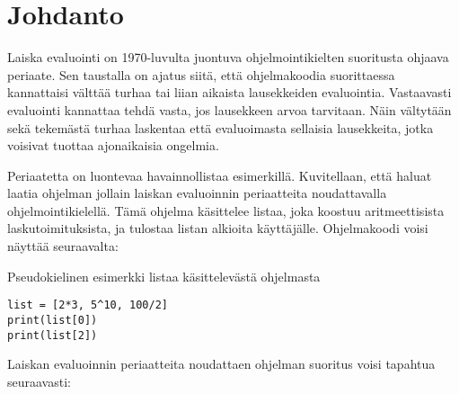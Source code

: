 
\section{Johdanto}

Laiska evaluointi on 1970-luvulta juontuva ohjelmointikielten suoritusta ohjaava periaate. Sen taustalla on ajatus siitä, että ohjelmakoodia suorittaessa kannattaisi välttää turhaa tai liian aikaista lausekkeiden evaluointia. Vastaavasti evaluointi kannattaa tehdä vasta, jos lausekkeen arvoa tarvitaan. Näin vältytään sekä tekemästä turhaa laskentaa että evaluoimasta sellaisia lausekkeita, jotka voisivat tuottaa ajonaikaisia ongelmia.

Periaatetta on luontevaa havainnollistaa esimerkillä. Kuvitellaan, että haluat laatia ohjelman jollain laiskan evaluoinnin periaatteita noudattavalla ohjelmointikielellä. Tämä ohjelma käsittelee listaa, joka koostuu aritmeettisista laskutoimituksista, ja tulostaa listan alkioita käyttäjälle. Ohjelmakoodi voisi näyttää seuraavalta:


\begin{listing}[H]
  \caption{Pseudokielinen esimerkki listaa käsittelevästä ohjelmasta}
  \bigskip
  \begin{verbatim}
list = [2*3, 5^10, 100/2]
print(list[0])
print(list[2])
  \end{verbatim}
\end{listing}

Laiskan evaluoinnin periaatteita noudattaen ohjelman suoritus voisi tapahtua seuraavasti:


